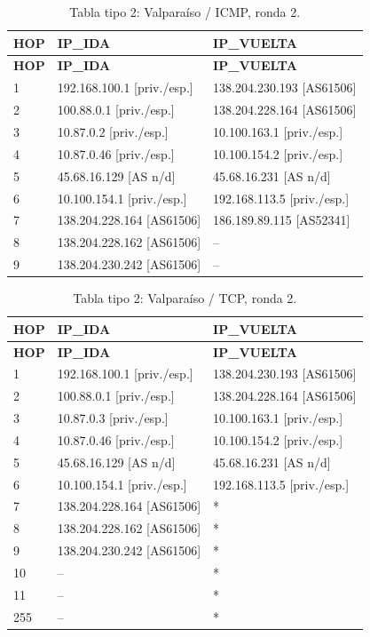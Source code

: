 \endgroup
\begingroup
\fontsize{9}{11}\selectfont
\begin{longtable}{p{0.95cm}p{7.075cm}p{7.075cm}}
\caption{Tabla tipo 2: Valparaíso / ICMP, ronda 2.}\label{tabla2:138.204.230.242:ICMP} \\
\toprule
\textbf{HOP} & \textbf{IP\_\allowbreak{}IDA} & \textbf{IP\_\allowbreak{}VUELTA} \\ \midrule
\endfirsthead
\toprule
\textbf{HOP} & \textbf{IP\_\allowbreak{}IDA} & \textbf{IP\_\allowbreak{}VUELTA} \\ \midrule
\endhead
1 & 192.168.100.1 [priv./esp.] & 138.204.230.193 [AS61506] \\
2 & 100.88.0.1 [priv./esp.] & 138.204.228.164 [AS61506] \\
3 & 10.87.0.2 [priv./esp.] & 10.100.163.1 [priv./esp.] \\
4 & 10.87.0.46 [priv./esp.] & 10.100.154.2 [priv./esp.] \\
5 & 45.68.16.129 [AS n/d] & 45.68.16.231 [AS n/d] \\
6 & 10.100.154.1 [priv./esp.] & 192.168.113.5 [priv./esp.] \\
7 & 138.204.228.164 [AS61506] & 186.189.89.115 [AS52341] \\
8 & 138.204.228.162 [AS61506] & -- \\
9 & 138.204.230.242 [AS61506] & -- \\
\bottomrule
\end{longtable}
\endgroup
\begingroup
\fontsize{9}{11}\selectfont
\begin{longtable}{p{0.95cm}p{7.075cm}p{7.075cm}}
\caption{Tabla tipo 2: Valparaíso / TCP, ronda 2.}\label{tabla2:138.204.230.242:TCP} \\
\toprule
\textbf{HOP} & \textbf{IP\_\allowbreak{}IDA} & \textbf{IP\_\allowbreak{}VUELTA} \\ \midrule
\endfirsthead
\toprule
\textbf{HOP} & \textbf{IP\_\allowbreak{}IDA} & \textbf{IP\_\allowbreak{}VUELTA} \\ \midrule
\endhead
1 & 192.168.100.1 [priv./esp.] & 138.204.230.193 [AS61506] \\
2 & 100.88.0.1 [priv./esp.] & 138.204.228.164 [AS61506] \\
3 & 10.87.0.3 [priv./esp.] & 10.100.163.1 [priv./esp.] \\
4 & 10.87.0.46 [priv./esp.] & 10.100.154.2 [priv./esp.] \\
5 & 45.68.16.129 [AS n/d] & 45.68.16.231 [AS n/d] \\
6 & 10.100.154.1 [priv./esp.] & 192.168.113.5 [priv./esp.] \\
7 & 138.204.228.164 [AS61506] & * \\
8 & 138.204.228.162 [AS61506] & * \\
9 & 138.204.230.242 [AS61506] & * \\
10 & -- & * \\
11 & -- & * \\
255 & -- & * \\
\bottomrule
\end{longtable}
